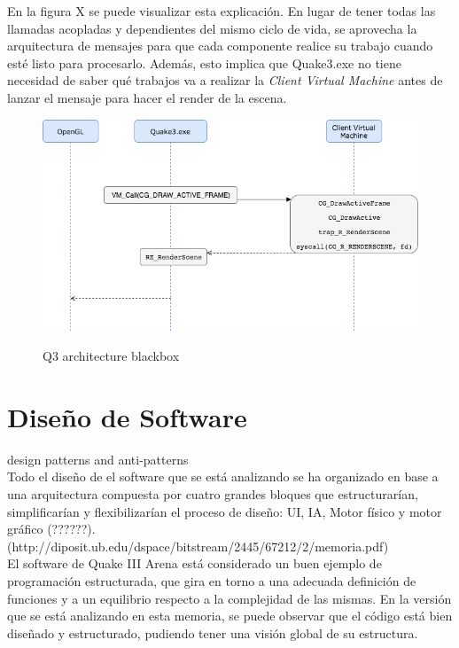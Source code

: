 \documentclass[a4paper,12pt]{report}
\begin{document}
    En la figura X se puede visualizar esta explicación. En lugar de tener todas las llamadas acopladas y dependientes del mismo ciclo de vida, se aprovecha la arquitectura de mensajes para que cada componente realice su trabajo cuando esté listo para procesarlo. Además, esto implica que Quake3.exe no tiene necesidad de saber qué trabajos va a realizar la \textit{Client Virtual Machine} antes de lanzar el mensaje para hacer el render de la escena.\\
    
    
    \begin{center}
    	\begin{figure}[h]
    		\includegraphics[width=1\textwidth]{images/diagrama}
    		\label{fig:diagrama}
    		\caption{Q3 architecture blackbox}
    	\end{figure}
    \end{center}
    

	
	
	\newpage
	\section{Diseño de Software}
	design patterns and anti-patterns\\
	
	Todo el diseño de el software que se está analizando se ha organizado en base a una arquitectura compuesta por cuatro grandes bloques que estructurarían, simplificarían y flexibilizarían el proceso de diseño: UI, IA, Motor físico y motor gráfico (??????).
	(http://diposit.ub.edu/dspace/bitstream/2445/67212/2/memoria.pdf)\\
	
	El software de Quake III Arena está considerado un buen ejemplo de programación estructurada, que gira en torno a una adecuada definición de funciones y a un equilibrio respecto a la complejidad de las mismas. En la versión que se está analizando en esta memoria, se puede observar que el código está bien diseñado y estructurado, pudiendo tener una visión global de su estructura.\\
	
\end{document}
